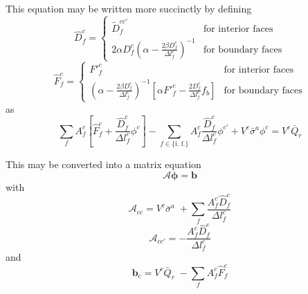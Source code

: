 \documentclass{article}
\newcommand{\bfunc}{\ensuremath{f_{b}}}
\begin{document}
This equation may be written more succinctly by defining
\begin{equation}
  \boxed{
	\hat{D}^{c}_{f}
	       = \left\{
                     \begin{array}{ll}
			\tilde{D}^{cc'}_{f}
			& \text{for interior faces} \\
			2\alpha D^{c}_{f}
			   \left( \alpha - \frac{2 \beta D^{c}_{f}}{\Delta l^{c}_{f}}
			   \right)^{-1}
			& \text{for boundary faces}
		     \end{array}
                    \right.
   }
\end{equation}
\begin{equation}
   \boxed{
	\hat{F}^{c}_{f}
	     =  \left\{
                     \begin{array}{ll}
			{F'}^{c}_{f}
			& \text{for interior faces} \\
			   \left( \alpha - \frac{2 \beta D^{c}_{f}}{\Delta l^{c}_{f}}
			   \right)^{-1}
                        \left[ \alpha {F'}^{c}_{f}
				 - \frac{2 D^{c}_{f}}{\Delta l^{c}_{f}} \bfunc
			\right]
			& \text{for boundary faces}
		     \end{array}
                    \right.
  }
\end{equation}
as
\begin{equation}
	\sum_{f} A^{c}_{f}
             \left[
		 \hat{F}^{c}_{f}
			 + \frac{\hat{D}^{c}_{f}}{\Delta l^{c}_{f}}  \phi^{c}
	     \right]
	- \sum_{f \in \{\text{i.\ f.}\}}
		A^{c}_{f} \frac{\hat{D}^{c}_{f}}{\Delta l^{c}_{f}} \phi^{c'}
	+ V^{c} \bar{\sigma}^{a} \phi^{c}
		= V^{c} \bar{Q}_{r}
\end{equation}

This may be converted into a matrix equation
\begin{equation}
	\mathcal{A} \boldsymbol{\phi} = \mathbf{b}
\end{equation}
with
\begin{equation}
   \boxed{
	\mathcal{A}_{cc} = V^{c} \bar{\sigma}^{a} \;
		+ \sum_{f}
			\frac{A^{c}_{f} \hat{D}^{c}_{f}}{\Delta l^{c}_{f}}
   }
\end{equation}
\begin{equation}
   \boxed{
	\mathcal{A}_{cc'} =
		 - \frac{A^{c}_{f} \hat{D}^{c}_{f}}{\Delta l^{c}_{f}}
   }
\label{eq:Accp}
\end{equation}
and
\begin{equation}
   \boxed{
	\mathbf{b}_{c} = V^{c} \bar{Q}_{r} \;
		- \sum_{f} A^{c}_{f} \hat{F}^{c}_{f}
   }
\end{equation}
\end{document}
